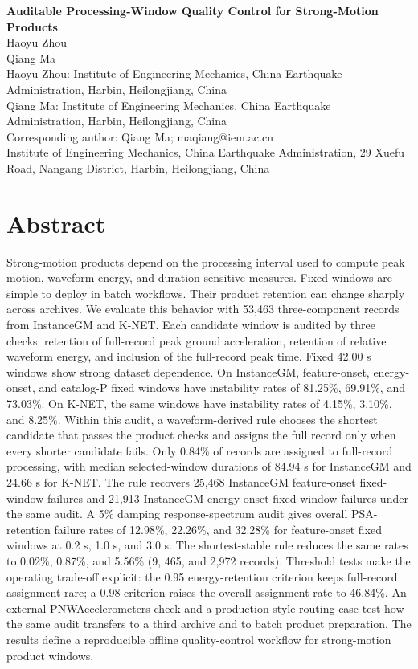 \documentclass[12pt,letterpaper]{article}
\begin{document}
\begin{center}
{\Large\bfseries Auditable Processing-Window Quality Control for Strong-Motion Products}\\[1.5em]
Haoyu Zhou\\Qiang Ma\\
\vspace{0.35em}
Haoyu Zhou: Institute of Engineering Mechanics, China Earthquake Administration, Harbin, Heilongjiang, China\\Qiang Ma: Institute of Engineering Mechanics, China Earthquake Administration, Harbin, Heilongjiang, China\\
\vspace{0.35em}
Corresponding author: Qiang Ma; maqiang@iem.ac.cn\\Institute of Engineering Mechanics, China Earthquake Administration, 29 Xuefu Road, Nangang District, Harbin, Heilongjiang, China\\
\end{center}
\thispagestyle{plain}

\section{Abstract}\label{abstract}

Strong-motion products depend on the processing interval used to compute peak motion, waveform energy, and duration-sensitive measures. Fixed windows are simple to deploy in batch workflows. Their product retention can change sharply across archives. We evaluate this behavior with 53,463 three-component records from InstanceGM and K-NET. Each candidate window is audited by three checks: retention of full-record peak ground acceleration, retention of relative waveform energy, and inclusion of the full-record peak time. Fixed 42.00 s windows show strong dataset dependence. On InstanceGM, feature-onset, energy-onset, and catalog-P fixed windows have instability rates of 81.25\%, 69.91\%, and 73.03\%. On K-NET, the same windows have instability rates of 4.15\%, 3.10\%, and 8.25\%. Within this audit, a waveform-derived rule chooses the shortest candidate that passes the product checks and assigns the full record only when every shorter candidate fails. Only 0.84\% of records are assigned to full-record processing, with median selected-window durations of 84.94 s for InstanceGM and 24.66 s for K-NET. The rule recovers 25,468 InstanceGM feature-onset fixed-window failures and 21,913 InstanceGM energy-onset fixed-window failures under the same audit. A 5\% damping response-spectrum audit gives overall PSA-retention failure rates of 12.98\%, 22.26\%, and 32.28\% for feature-onset fixed windows at 0.2 s, 1.0 s, and 3.0 s. The shortest-stable rule reduces the same rates to 0.02\%, 0.87\%, and 5.56\% (9, 465, and 2,972 records). Threshold tests make the operating trade-off explicit: the 0.95 energy-retention criterion keeps full-record assignment rare; a 0.98 criterion raises the overall assignment rate to 46.84\%. An external PNWAccelerometers check and a production-style routing case test how the same audit transfers to a third archive and to batch product preparation. The results define a reproducible offline quality-control workflow for strong-motion product windows.
\end{document}
